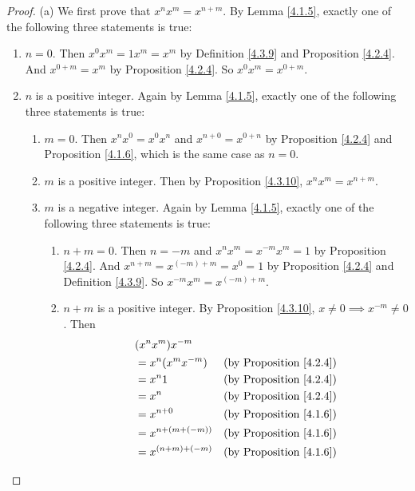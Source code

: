 \begin{proof}{(a)}
We first prove that \(x^n x^m = x^{n + m}\).
By Lemma \ref{4.1.5}, exactly one of the following three statements is true:
\begin{enumerate}[label=(\Roman*)]
    \item \(n = 0\).
    Then \(x^0 x^m = 1x^m = x^m\) by Definition \ref{4.3.9} and Proposition \ref{4.2.4}.
    And \(x^{0 + m} = x^m\) by Proposition \ref{4.2.4}.
    So \(x^0 x^m = x^{0 + m}\).
    \item \(n\) is a positive integer.
    Again by Lemma \ref{4.1.5}, exactly one of the following three statements is true:
    \begin{enumerate}[label=(\roman*)]
        \item \(m = 0\).
        Then \(x^n x^0 = x^0 x^n\) and \(x^{n + 0} = x^{0 + n}\) by Proposition \ref{4.2.4} and Proposition \ref{4.1.6}, which is the same case as \(n = 0\).
        \item \(m\) is a positive integer.
        Then by Proposition \ref{4.3.10}, \(x^n x^m = x^{n + m}\).
        \item \(m\) is a negative integer.
        Again by Lemma \ref{4.1.5}, exactly one of the following three statements is true:
        \begin{enumerate}[label=(\arabic*)]
            \item \(n + m = 0\).
            Then \(n = -m\) and \(x^n x^m = x^{-m} x^m = 1\) by Proposition \ref{4.2.4}.
            And \(x^{n + m} = x^{(-m) + m} = x^0 = 1\) by Proposition \ref{4.2.4} and Definition \ref{4.3.9}.
            So \(x^{-m} x^m = x^{(-m) + m}\).
            \item \(n + m\) is a positive integer.
            By Proposition \ref{4.3.10}, \(x \neq 0 \implies x^{-m} \neq 0\).
            Then
            \begin{align*}
            & (x^n x^m) x^{-m} \\
            &= x^n (x^m x^{-m}) & \text{(by Proposition \ref{4.2.4})} \\
            &= x^n 1 & \text{(by Proposition \ref{4.2.4})} \\
            &= x^n & \text{(by Proposition \ref{4.2.4})} \\
            &= x^{n + 0} & \text{(by Proposition \ref{4.1.6})} \\
            &= x^{n + (m + (-m))} & \text{(by Proposition \ref{4.1.6})} \\
            &= x^{(n + m) + (-m)} & \text{(by Proposition \ref{4.1.6})} \\

\end{align*}
\end{enumerate}
\end{enumerate}
\end{enumerate}
\end{proof}
